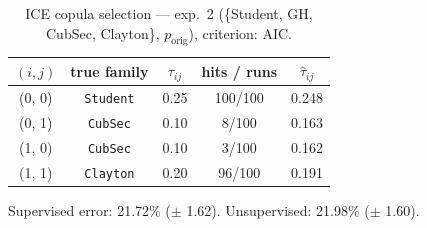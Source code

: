 \begin{table}[htbp]
  \centering
  \caption{ICE copula selection — exp.\ 2 (\{Student, GH, CubSec, Clayton\}, $p_{\text{orig}}$), criterion: AIC.}
  \label{tab:exp3-exp2_orig_p__aic}
  \begin{tabular}{ccccc}
    \toprule
    $(i, j)$ & true family & $\tau_{ij}$ & hits / runs & $\hat\tau_{ij}$ \\
    \midrule
    (0, 0) & \texttt{Student} & 0.25 & 100/100 & 0.248 \\
    (0, 1) & \texttt{CubSec} & 0.10 & 8/100 & 0.163 \\
    (1, 0) & \texttt{CubSec} & 0.10 & 3/100 & 0.162 \\
    (1, 1) & \texttt{Clayton} & 0.20 & 96/100 & 0.191 \\
    \bottomrule
  \end{tabular}
  \par\smallskip Supervised error: 21.72\% ($\pm$ 1.62). Unsupervised: 21.98\% ($\pm$ 1.60).
\end{table}
